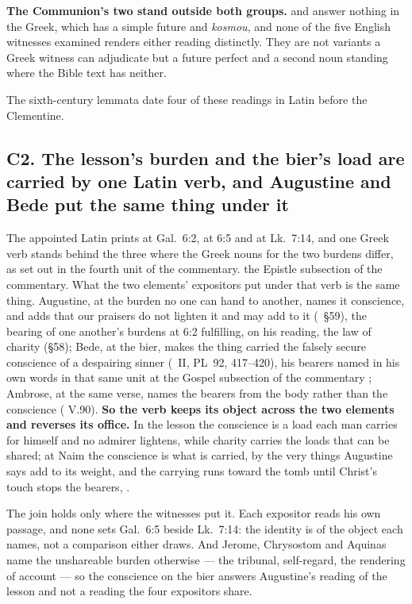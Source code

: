 \textbf{The Communion's two stand outside both groups.}  and
 answer nothing in the Greek, which has a simple future and
\emph{kosmou}, and none of the five English witnesses examined renders either
reading distinctly. They are not variants a Greek witness can adjudicate but a future
perfect and a second noun standing where the Bible text has neither.

The sixth-century lemmata date four of these readings in Latin before the
Clementine.

\subsection*{C2. The lesson's burden and the bier's load are carried by one Latin verb, and Augustine and Bede put the same thing under it}

The appointed Latin prints  at Gal.\ 6:2,  at 6:5
and  at Lk.\ 7:14, and one Greek verb stands behind the
three where the Greek nouns for the two burdens differ, as set out in
\ifdefined\TriptychSynthesisEdition
the fourth unit of the commentary.%
\else
the Epistle subsection of the commentary.%
\fi{} What the two elements' expositors put under that verb is the
same thing. Augustine, at the burden no one can hand to another, names it
conscience, and adds that our praisers do not lighten it and may add to it
(~§59), the bearing of one another's burdens at 6:2 fulfilling,
on his reading, the law of charity (§58); Bede, at the bier, makes the thing
carried the falsely secure conscience of a despairing sinner (~II, PL~92, 417--420), his bearers named in his own words
\ifdefined\TriptychSynthesisEdition
in that same unit%
\else
at the Gospel subsection of the commentary%
\fi{}; Ambrose, at the same verse, names the bearers from the
body rather than the conscience ( V.90). \textbf{So the verb keeps its object across
the two elements and reverses its office.} In the lesson the conscience is a load
each man carries for himself and no admirer lightens, while charity carries the
loads that can be shared; at Naim the conscience is what is carried, by the very
things Augustine says add to its weight, and the carrying runs toward the tomb
until Christ's touch stops the bearers, .

The join holds only where the witnesses put it. Each expositor reads his
own passage, and none sets Gal.\ 6:5 beside Lk.\ 7:14: the identity is of the
object each names, not a comparison either draws. And Jerome, Chrysostom and
Aquinas name the unshareable burden otherwise --- the tribunal, self-regard, the
rendering of account --- so the conscience on the bier answers Augustine's
reading of the lesson and not a reading the four expositors share.

